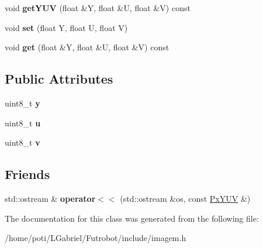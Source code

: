 \begin{DoxyCompactItemize}
\item 
void {\bfseries get\+Y\+UV} (float \&Y, float \&U, float \&V) const \hypertarget{classPxYUV_a1bade80b7f5c41ef8d397af99d339b9e}{}\label{classPxYUV_a1bade80b7f5c41ef8d397af99d339b9e}

\item 
void {\bfseries set} (float Y, float U, float V)\hypertarget{classPxYUV_a030dd166810ee7d118aa63ca023e4a3a}{}\label{classPxYUV_a030dd166810ee7d118aa63ca023e4a3a}

\item 
void {\bfseries get} (float \&Y, float \&U, float \&V) const \hypertarget{classPxYUV_a9bfd44c60fb00b964cede59e6da7ce9c}{}\label{classPxYUV_a9bfd44c60fb00b964cede59e6da7ce9c}

\end{DoxyCompactItemize}
\subsection*{Public Attributes}
\begin{DoxyCompactItemize}
\item 
uint8\+\_\+t {\bfseries y}\hypertarget{classPxYUV_ae0d5e7bb94ccf9579062b9aa2ba0c009}{}\label{classPxYUV_ae0d5e7bb94ccf9579062b9aa2ba0c009}

\item 
uint8\+\_\+t {\bfseries u}\hypertarget{classPxYUV_a327230a7e1a19670a1d71e1472f891d4}{}\label{classPxYUV_a327230a7e1a19670a1d71e1472f891d4}

\item 
uint8\+\_\+t {\bfseries v}\hypertarget{classPxYUV_a027ca03c100b1c09910174e7b197dad7}{}\label{classPxYUV_a027ca03c100b1c09910174e7b197dad7}

\end{DoxyCompactItemize}
\subsection*{Friends}
\begin{DoxyCompactItemize}
\item 
std\+::ostream \& {\bfseries operator$<$$<$} (std\+::ostream \&os, const \hyperlink{classPxYUV}{Px\+Y\+UV} \&)\hypertarget{classPxYUV_a2ccc847f2f37e2902fba8274d14a69e0}{}\label{classPxYUV_a2ccc847f2f37e2902fba8274d14a69e0}

\end{DoxyCompactItemize}


The documentation for this class was generated from the following file\+:\begin{DoxyCompactItemize}
\item 
/home/poti/\+L\+Gabriel/\+Futrobot/include/imagem.\+h\end{DoxyCompactItemize}
